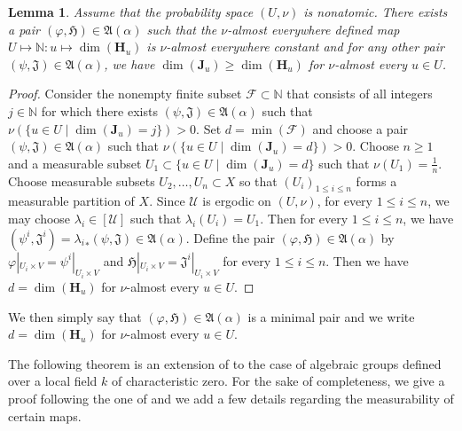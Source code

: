 \documentclass[11pt]{amsart}
\numberwithin{equation}{section}
\theoremstyle{plain}
\newtheorem{lem}[thm]{Lemma}
\theoremstyle{definition}
\newcommand{\N}{\mathbb{N}}
\begin{document}
\begin{lem}\label{lem-initial}
Assume that the probability space $(U, \nu)$ is nonatomic. There exists a pair $(\varphi, \mathfrak H) \in \mathfrak A(\alpha)$ such that the $\nu$-almost everywhere defined map $U \mapsto \N : u  \mapsto \dim(\mathbf H_u)$ is $\nu$-almost everywhere constant and for any other pair $(\psi, \mathfrak J) \in \mathfrak A(\alpha)$, we have $\dim(\mathbf J_u) \geq \dim(\mathbf H_u)$ for $\nu$-almost every $u \in U$.
\end{lem}

\begin{proof}
Consider the nonempty finite subset $\mathscr F \subset \N$ that consists of all integers $j \in \N$ for which there exists $(\psi, \mathfrak J) \in \mathfrak A(\alpha)$ such that $\nu(\{ u \in U \mid \dim(\mathbf J_u) = j\}) > 0$. Set $d = \min(\mathscr F)$ and choose a pair $(\psi, \mathfrak J) \in \mathfrak A(\alpha)$ such that $\nu(\{ u \in U \mid \dim(\mathbf J_u) = d \}) > 0$. Choose $n \geq 1$ and a measurable subset $U_1 \subset \{ u \in U \mid \dim(\mathbf J_u) = d\}$ such that $\nu(U_1) = \frac1n$. Choose measurable subsets $U_2, \dots, U_n \subset X$ so that $(U_i)_{1 \leq i \leq n}$ forms a measurable partition of $X$. Since $\mathscr U$ is ergodic on $(U, \nu)$, for every $1 \leq i \leq n$, we may choose $\lambda_i \in [\mathscr U]$ such that $\lambda_i(U_i) = U_1$. Then for every $1 \leq i \leq n$, we have $(\psi^i, \mathfrak J^i) = {\lambda_i}_\ast(\psi, \mathfrak J) \in \mathfrak A(\alpha)$. Define the pair $(\varphi, \mathfrak H) \in \mathfrak A(\alpha)$ by $\varphi|_{U_i \times V} = \psi^i|_{U_i \times V}$ and $\mathfrak H|_{U_i \times V} = \mathfrak J^i|_{U_i \times V}$ for every $1 \leq i \leq n$. Then we have $d = \dim(\mathbf H_u)$ for $\nu$-almost every $u \in U$.
\end{proof}

We then simply say that $(\varphi, \mathfrak H)  \in \mathfrak A(\alpha)$ is a minimal pair and we write $d = \dim(\mathbf H_u)$ for $\nu$-almost every $u \in U$.







The following theorem is an extension of \cite[Lemma 2.1]{Zi81} to the case of algebraic groups defined over a local field $k$ of characteristic zero. For the sake of completeness, we give a proof following the one of \cite[Lemma 2.1]{Zi81} and we add a few details regarding the measurability of certain maps.
\end{document}
